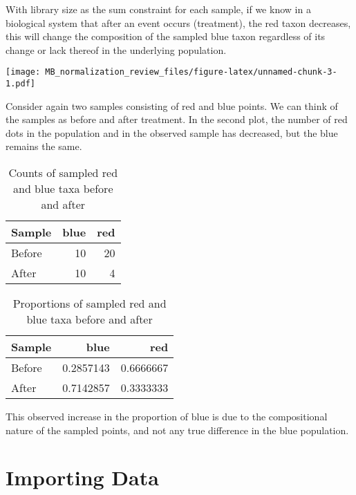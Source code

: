\documentclass[
]{book}
\begin{document}
With library size as the sum constraint for each sample, if we know in a biological system that after an event occurs (treatment), the red taxon decreases, this will change the composition of the sampled blue taxon regardless of its change or lack thereof in the underlying population.

\texttt{[image: MB\_normalization\_review\_files/figure-latex/unnamed-chunk-3-1.pdf]}

Consider again two samples consisting of red and blue points. We can think of the samples as before and after treatment. In the second plot, the number of red dots in the population and in the observed sample has decreased, but the blue remains the same.

\begin{table}

\caption{\label{tab:unnamed-chunk-4}Counts of sampled red and blue taxa before and after}
\centering
\begin{tabular}[t]{l|r|r}
\hline
Sample & blue & red\\
\hline
Before & 10 & 20\\
\hline
After & 10 & 4\\
\hline
\end{tabular}
\end{table}

\begin{table}

\caption{\label{tab:unnamed-chunk-4}Proportions of sampled red and blue taxa before and after}
\centering
\begin{tabular}[t]{l|r|r}
\hline
Sample & blue & red\\
\hline
Before & 0.2857143 & 0.6666667\\
\hline
After & 0.7142857 & 0.3333333\\
\hline
\end{tabular}
\end{table}

This observed increase in the proportion of blue is due to the compositional nature of the sampled points, and not any true difference in the blue population.

\hypertarget{importing-data}{%
\chapter{Importing Data}\label{importing-data}}
\end{document}
